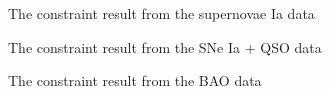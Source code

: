 \documentclass[twocolumn]{aastex631}
\begin{document}
   \begin{figure}[htbp]
      \centering
      \caption{The constraint result from the supernovae
      Ia data}
   \end{figure}

   \begin{figure}[htbp]
      \centering
      \caption{The constraint result from the SNe Ia + QSO data}
   \end{figure}

   \begin{figure}[htbp]
      \centering
      \caption{The constraint result from the BAO data}
   \end{figure}
\end{document}
